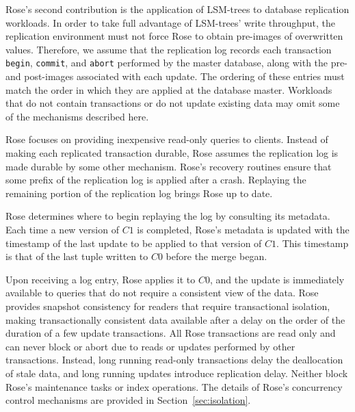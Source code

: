 \documentclass{vldb}
\newcommand{\rows}{Rose\xspace}
\newcommand{\rowss}{Rose's\xspace}
\begin{document}
\rowss second contribution is the application of LSM-trees to database
replication workloads.  In order to take full advantage of LSM-trees'
write throughput, the replication environment must not force \rows to
obtain pre-images of overwritten values.  Therefore, we assume that the
replication log records each transaction {\tt begin}, {\tt commit},
and {\tt abort} performed by the master database, along with the pre-
and post-images associated with each update.  The ordering of
these entries must match the order in which they are applied at the
database master.  Workloads that do not contain transactions or do not
update existing data may omit some of the mechanisms described here.

\rows focuses on providing inexpensive read-only queries to clients.
Instead of making each replicated transaction durable, \rows assumes
the replication log is made durable by some other mechanism.  \rowss
recovery routines ensure that some prefix of the replication log is
applied after a crash.  Replaying the remaining portion of the
replication log brings \rows up to date.  

\rows determines where to begin replaying the log by consulting its 
metadata.  Each time a new version of $C1$ is
completed, \rowss metadata is updated with the timestamp of the last
update to be applied to that version of $C1$.  This timestamp is that
of the last tuple written to $C0$ before the merge began.


Upon receiving a
log entry, \rows applies it to $C0$, and the update is immediately
available to queries that do not require a consistent view of the
data.  \rows provides snapshot consistency for readers that require
transactional isolation, making transactionally consistent data
available after a delay on the order of the duration of a few update
transactions.  All \rows transactions are read only and can
never block or abort due to reads or updates performed by other transactions.
Instead, long running read-only transactions delay the
deallocation of stale data, and long running updates introduce
replication delay.  Neither block \rowss maintenance tasks or index
operations.  The details of \rowss concurrency control mechanisms are
provided in Section~\ref{sec:isolation}.

\end{document}
